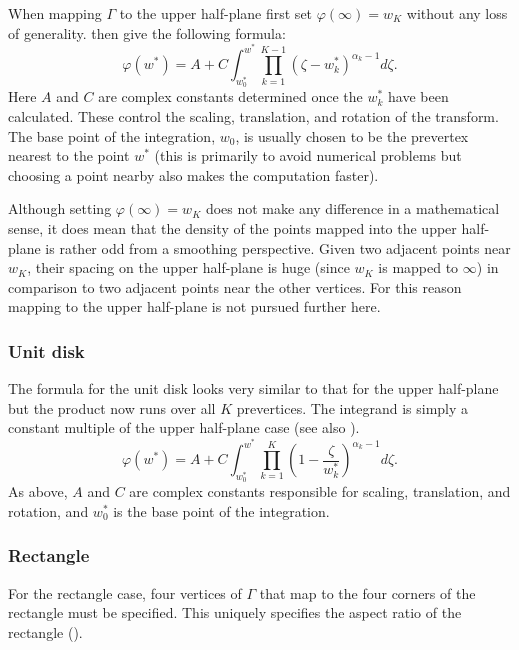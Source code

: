 When mapping $\Gamma$ to the upper half-plane first set $\varphi(\infty) = w_K$ without any loss of generality.  then give the following formula:
\begin{equation}
\varphi(w^*) = A + C \int^{w^*}_{w^*_0} \prod_{k=1}^{K-1} \left (\zeta-w^*_k \right )^{\alpha_k-1} d\zeta.
\end{equation}
Here $A$ and $C$ are complex constants determined once the $w^*_k$ have been calculated. These control the scaling, translation, and rotation of the transform. The base point of the integration, $w_0$, is usually chosen to be the prevertex nearest to the point $w^*$ (this is primarily to avoid numerical problems but choosing a point nearby also makes the computation faster).

Although setting $\varphi(\infty) = w_K$ does not make any difference in a mathematical sense, it does mean that the density of the points mapped into the upper half-plane is rather odd from a smoothing perspective. Given two adjacent points near $w_K$, their spacing on the upper half-plane is huge (since $w_K$ is mapped to $\infty$) in comparison to two adjacent points near the other vertices. For this reason mapping to the upper half-plane is not pursued further here.

\subsubsection{Unit disk}

The formula for the unit disk looks very similar to that for the upper half-plane but the product now runs over all $K$ prevertices. The integrand is simply a constant multiple of the upper half-plane case (see also \cite[p. 12]{driscoll}).
\begin{equation}
\label{unitscmap}
\varphi(w^*) = A + C \int^{w^*}_{w^*_0} \prod_{k=1}^{K} \left (1 - \frac{\zeta}{w^*_k} \right )^{\alpha_k-1} d\zeta.
\end{equation}
As above, $A$ and $C$ are complex constants responsible for scaling, translation, and rotation, and $w^*_0$ is the base point of the integration.

\subsubsection{Rectangle}

For the rectangle case, four vertices of $\Gamma$ that map to the four corners of the rectangle must be specified. This uniquely specifies the aspect ratio of the rectangle (\cite[p. 48]{driscoll}).

